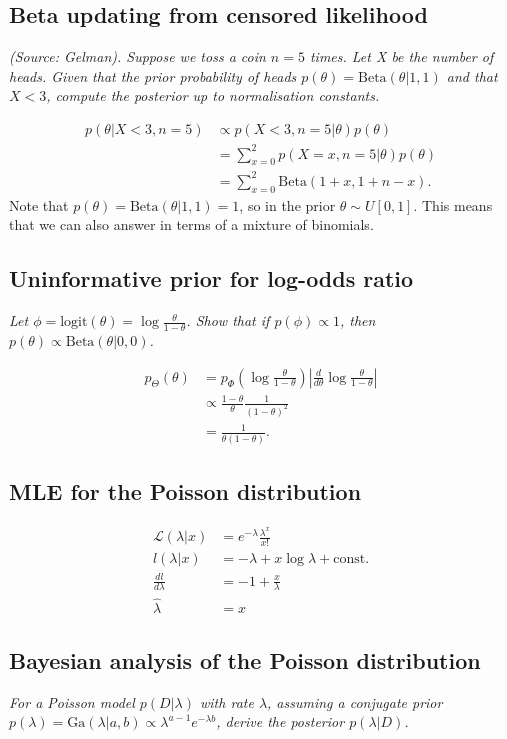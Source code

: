 \subsection{Beta updating from censored likelihood}
\textit{(Source: Gelman). Suppose we toss a coin $n=5$ times. Let X be the number of heads. Given that the prior probability of heads $p(\theta) = \text{Beta}(\theta|1,1)$ and that $X<3$, compute the posterior up to normalisation constants.}

\begin{align*}
p(\theta|X<3, n=5) &\propto p(X<3, n=5|\theta)p(\theta)\\
&= \sum_{x=0}^2 p(X=x, n=5|\theta)p(\theta)\\
&= \sum_{x=0}^2 \mathrm{Beta}(1+x,1+n-x).
\end{align*}
Note that $p(\theta) = \text{Beta}(\theta|1,1) = 1$, so in the prior $\theta \sim U[0,1]$. This means that we can also answer in terms of a mixture of binomials.

\subsection{Uninformative prior for log-odds ratio}
\textit{Let $\phi = \text{logit}(\theta) = \log\frac{\theta}{1-\theta}$. Show that if $p(\phi) \propto 1$, then $p(\theta) \propto \text{Beta}(\theta|0,0)$.}

\begin{align*}
p_\Theta(\theta) &= p_\Phi\left(\log\frac{\theta}{1-\theta}\right) \left|\frac{d}{d\theta}\log\frac{\theta}{1-\theta}\right|\\
&\propto \frac{1-\theta}{\theta} \frac{1}{(1-\theta)^2}\\
&= \frac{1}{\theta(1-\theta)}.
\end{align*}

\subsection{MLE for the Poisson distribution}
\begin{align*}
\mathcal{L}(\lambda|x) &= e^{-\lambda}\frac{\lambda^x}{x!}\\
l(\lambda|x) &= -\lambda + x\log\lambda + \text{const.}\\
\frac{dl}{d\lambda} &= -1 + \frac{x}{\lambda}\\
\hat\lambda &= x
\end{align*}

\subsection{Bayesian analysis of the Poisson distribution}
\textit{For a Poisson model $p(D | \lambda)$ with rate $\lambda$, assuming a conjugate prior $p(\lambda) = \text{Ga}(\lambda| a, b) \propto \lambda^{a-1}e^{-\lambda b}$, derive the posterior $p(\lambda | D)$.}

